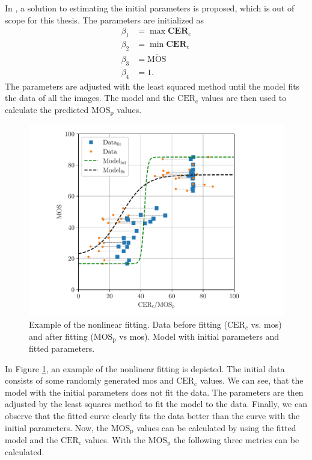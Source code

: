 In \cite{nonlin_fit_init_proof_2017}, a solution to estimating the initial parameters is proposed, which is out of scope for this thesis.
The parameters are initialized as
\begin{equation}
    \begin{aligned}
        \beta_{1} &= \max{\mathbf{CER}_{\text{c}}} \\
        \beta_{2} &= \min{\mathbf{CER}_{\text{c}}} \\
        \beta_{3} &= \overline{\text{MOS}} \\
        \beta_{4} &= 1.
    \end{aligned}
    \label{eq:nonlinear_init}
\end{equation}
The parameters are adjusted with the least squared method \cite{least_squares_1978} until the model fits the data of all the images.
The model and the $\text{CER}_{\text{c}}$ values are then used to calculate the predicted $\text{MOS}_{\text{p}}$ values.

\begin{figure}[h]
    \centering
    \includegraphics[width=\textwidth]{../images/fit_example.pdf}
    \caption{Example of the nonlinear fitting. Data before fitting ($\text{CER}_{c}$ vs. \gls{mos}) and after fitting ($\text{MOS}_{\text{p}}$ vs \gls{mos}). Model with initial parameters and fitted parameters.}
    \label{fig:nonlinear_fit}
\end{figure}

In Figure \ref{fig:nonlinear_fit}, an example of the nonlinear fitting is depicted.
The initial data consists of some randomly generated \gls{mos} and $\text{CER}_{\text{c}}$ values.
We can see, that the model with the initial parameters does not fit the data.
The parameters are then adjusted by the least squares method \cite{least_squares_1978} to fit the model to the data.
Finally, we can observe that the fitted curve clearly fits the data better than the curve with the initial parameters.
Now, the $\text{MOS}_{\text{p}}$ values can be calculated by using the fitted model and the $\text{CER}_{\text{c}}$ values.
With the $\text{MOS}_{\text{p}}$ the following three metrics \cite{iqa_survey_2021} can be calculated.

